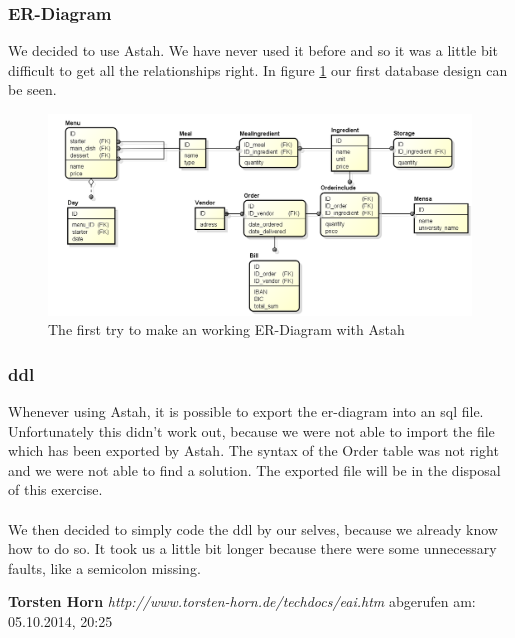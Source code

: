 \documentclass[12pt]{article}
\begin{document}
\subsubsection{ER-Diagram}
We decided to use Astah. We have never used it before and so it was a little bit difficult to get all the relationships right.
In figure \ref{fig:try1} our first database design can be seen.
 \begin{figure}[here!]
	\centering
	\includegraphics[width=1.0\textwidth]{er_vorlaeufig.png}
	\caption{The first try to make an working ER-Diagram with Astah}
	\label{fig:try1}
	\end{figure}
	
\subsubsection{\gls{ddl}}
Whenever using Astah, it is possible to export the \gls{er}-diagram into an \gls{sql} file. \\
Unfortunately this didn't work out, because we were not able to import the file which has been exported by Astah.
The syntax of the Order table was not right and we were not able to find a solution. The exported file will be in the disposal of this exercise. \\ \\
We then decided to simply code the \gls{ddl} by our selves, because we already know how to do so. It took us a little bit longer because there were some unnecessary faults, like a semicolon missing.

 

	
\newpage
\printglossaries
\listoffigures
\newpage
\begin{thebibliography}{56}

   \textbf{Torsten Horn}\newline
  \emph{http://www.torsten-horn.de/techdocs/eai.htm}
  \newline abgerufen am: 05.10.2014, 20:25


\end{thebibliography}
\end{document}
